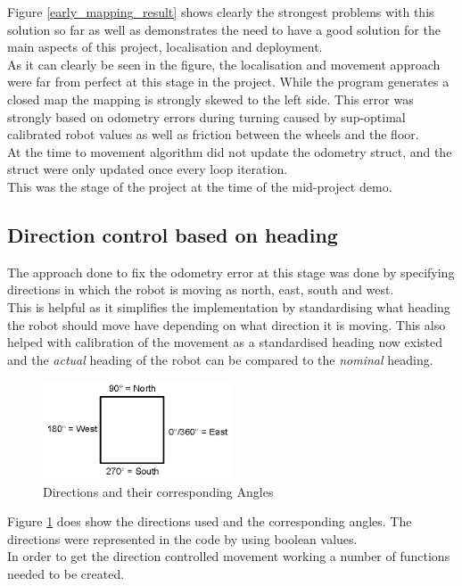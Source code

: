 Figure \ref{early_mapping_result} shows clearly the strongest problems with this solution so far as well as demonstrates the need to have a good solution for  the main aspects of this project, localisation and deployment.\\
As it can clearly be seen in the figure, the localisation and movement approach were far from perfect at this stage in the project.
While the program generates a closed  map the mapping is strongly skewed to the left side. This error was strongly based on odometry errors during turning caused by sup-optimal calibrated robot values as well as friction between the wheels and the floor.\\
At the time to movement algorithm did not update the odometry struct, and the struct were only updated once every loop iteration. \\
This was the stage of the project at the time of the mid-project demo.


\subsection{Direction control based on heading}
The approach done to fix the odometry error at this stage was done by specifying directions in which the robot is moving as north, east, south and west.\\
This is helpful as it simplifies the implementation by standardising what heading the robot should move have depending on what direction it is moving. This also helped with calibration of the movement as a standardised heading now existed and the \textit{actual} heading of the robot can be compared to the \textit{nominal} heading.

\begin{figure}[h]
\centering
\includegraphics[width = 0.5\textwidth]{../../figures/direction_and_angles}
\caption{Directions and their corresponding Angles}
\label{directions_and_angles}
\end{figure}

Figure \ref{directions_and_angles} does show the directions used and the corresponding angles. The directions were represented in the code by using boolean values. \\
In order to get the direction controlled movement working a number of functions needed to be created. 


